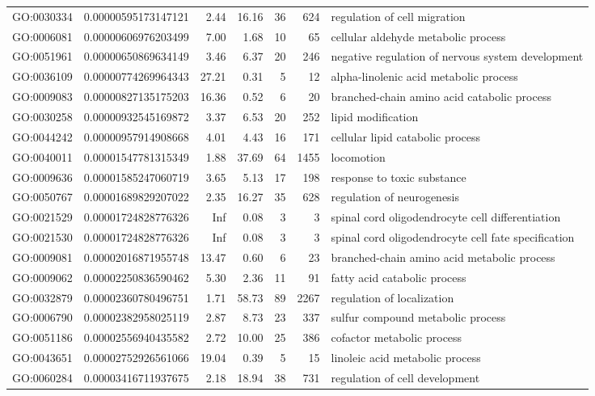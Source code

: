 \documentclass[letterpaper,12pt]{article}
\numberwithin{equation}{appendix}
\begin{document}
\begin{landscape}
{{\begin{longtable}{lrrrrrl}
  GO:0030334 & 0.00000595173147121 & 2.44 & 16.16 & 36 & 624 & regulation of cell migration \\ 
  GO:0006081 & 0.00000606976203499 & 7.00 & 1.68 & 10 & 65 & cellular aldehyde metabolic process \\ 
  GO:0051961 & 0.00000650869634149 & 3.46 & 6.37 & 20 & 246 & negative regulation of nervous system development \\ 
  GO:0036109 & 0.00000774269964343 & 27.21 & 0.31 & 5 & 12 & alpha-linolenic acid metabolic process \\ 
  GO:0009083 & 0.00000827135175203 & 16.36 & 0.52 & 6 & 20 & branched-chain amino acid catabolic process \\ 
  GO:0030258 & 0.00000932545169872 & 3.37 & 6.53 & 20 & 252 & lipid modification \\ 
  GO:0044242 & 0.00000957914908668 & 4.01 & 4.43 & 16 & 171 & cellular lipid catabolic process \\ 
  GO:0040011 & 0.00001547781315349 & 1.88 & 37.69 & 64 & 1455 & locomotion \\ 
  GO:0009636 & 0.00001585247060719 & 3.65 & 5.13 & 17 & 198 & response to toxic substance \\ 
  GO:0050767 & 0.00001689829207022 & 2.35 & 16.27 & 35 & 628 & regulation of neurogenesis \\ 
  GO:0021529 & 0.00001724828776326 & Inf & 0.08 & 3 & 3 & spinal cord oligodendrocyte cell differentiation \\ 
  GO:0021530 & 0.00001724828776326 & Inf & 0.08 & 3 & 3 & spinal cord oligodendrocyte cell fate specification \\ 
  GO:0009081 & 0.00002016871955748 & 13.47 & 0.60 & 6 & 23 & branched-chain amino acid metabolic process \\ 
  GO:0009062 & 0.00002250836590462 & 5.30 & 2.36 & 11 & 91 & fatty acid catabolic process \\ 
  GO:0032879 & 0.00002360780496751 & 1.71 & 58.73 & 89 & 2267 & regulation of localization \\ 
  GO:0006790 & 0.00002382958025119 & 2.87 & 8.73 & 23 & 337 & sulfur compound metabolic process \\ 
  GO:0051186 & 0.00002556940435582 & 2.72 & 10.00 & 25 & 386 & cofactor metabolic process \\ 
  GO:0043651 & 0.00002752926561066 & 19.04 & 0.39 & 5 & 15 & linoleic acid metabolic process \\ 
  GO:0060284 & 0.00003416711937675 & 2.18 & 18.94 & 38 & 731 & regulation of cell development \\ 

\end{longtable}}}
\end{landscape}
\end{document}
